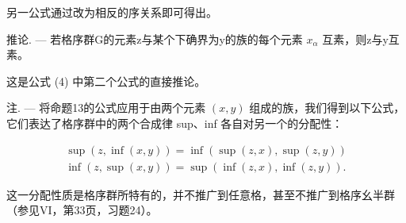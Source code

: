 另一公式通过改为相反的序关系即可得出。

推论. --- 若格序群G的元素z与某个下确界为y的族的每个元素 \(x_{\alpha}\) 互素，则z与y互素。

这是公式 (4) 中第二个公式的直接推论。

注. --- 将命题13的公式应用于由两个元素 \((x, y)\) 组成的族，我们得到以下公式，它们表达了格序群中的两个合成律 sup、inf 各自对另一个的分配性：

\[
\begin{array}{l} \sup (z, \inf (x, y)) = \inf (\sup (z, x), \sup (z, y)) \\ \inf (z, \sup (x, y)) = \sup (\inf (z, x), \inf (z, y)). \end{array}
\]

这一分配性质是格序群所特有的，并不推广到任意格，甚至不推广到格序幺半群（参见VI，第33页，习题24）。
\relax{}
